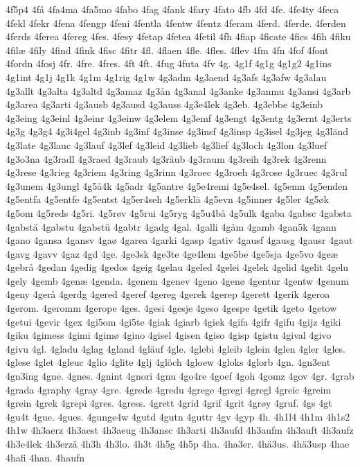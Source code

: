 4f5p4
4få
4fa4ma
4fa5mo
4fabo
4fag
4fank
4fary
4fato
4fb
4fd
4fe.
4fe4ty
4feca
4fekl
4fekr
4fena
4fengp
4feni
4fentla
4fentw
4fentz
4feram
4ferd.
4ferde.
4ferden
4ferds
4ferea
4fereg
4fes.
4fesy
4fetap
4fetea
4fetil
4fh
4fiap
4ficate
4fics
4fih
4fiku
4filæ
4fily
4find
4fink
4fisc
4fitr
4fl.
4flaen
4fle.
4fles.
4flev
4fm
4fn
4fof
4font
4fordn
4fosj
4fr.
4fre.
4fres.
4ft
4ft.
4fug
4futa
4fv
4g.
4g1f
4g1g
4g1g2
4g1ins
4g1int
4g1j
4g1k
4g1m
4g1rig
4g1w
4g3adm
4g3aend
4g3afs
4g3afw
4g3alau
4g3allt
4g3alta
4g3altd
4g3amaz
4g3ån
4g3anal
4g3anke
4g3anmu
4g3ansi
4g3arb
4g3area
4g3arti
4g3ausb
4g3ausd
4g3auss
4g3e4lek
4g3eb.
4g3ebbe
4g3einb
4g3eing
4g3einl
4g3einr
4g3einw
4g3elem
4g3emf
4g3engt
4g3entg
4g3ernt
4g3erts
4g3g
4g3g4
4g3i4gel
4g3inb
4g3inf
4g3inse
4g3insf
4g3insp
4g3isel
4g3jeg
4g3länd
4g3late
4g3lauc
4g3lauf
4g3lef
4g3leid
4g3lieb
4g3lief
4g3loch
4g3lon
4g3luef
4g3o3na
4g3radl
4g3raed
4g3raub
4g3räub
4g3raum
4g3reih
4g3rek
4g3renn
4g3rese
4g3rieg
4g3riem
4g3ring
4g3rinn
4g3roec
4g3roeh
4g3rose
4g3ruec
4g3rul
4g3unem
4g3ungl
4g5å4k
4g5adr
4g5antre
4g5e4remi
4g5e4sel.
4g5emn
4g5enden
4g5entfa
4g5entfe
4g5entst
4g5er4seh
4g5erklä
4g5evn
4g5inner
4g5ler
4g5øk
4g5om
4g5reds
4g5ri.
4g5røv
4g5rui
4g5ryg
4g5u4bå
4g5ulk
4gaba
4gabsc
4gabsta
4gabstä
4gabstu
4gabstü
4gabtr
4gadg
4gal.
4galli
4gåm
4gamb
4gan5k
4gann
4gano
4gansa
4gansv
4gaø
4garea
4garki
4gasp
4gativ
4gausf
4gausg
4gausr
4gaut
4gavg
4gavv
4gaz
4gd
4ge.
4ge3sk
4ge3te
4ge4lem
4ge5be
4ge5sja
4ge5vo
4geæ
4gebrå
4gedan
4gedig
4gedos
4geig
4gelau
4geled
4gelei
4gelek
4gelid
4gelit
4gelu
4gely
4gemb
4genæ
4genda.
4genem
4genev
4geno
4genø
4gentur
4gentw
4genum
4geny
4gerå
4gerdg
4gered
4geref
4gereg
4gerek
4gerep
4gerett
4gerik
4geroa
4gerom.
4geromm
4gerope
4ges.
4gesi
4gesje
4geso
4gespe
4getik
4geto
4getow
4getui
4gevir
4gex
4gi5om
4gi5te
4giak
4giarb
4giek
4gifa
4gifr
4gifu
4gijz
4giki
4giku
4gimess
4gimi
4gimø
4gino
4gisel
4gisen
4giso
4gisp
4gistu
4gival
4givo
4givu
4gl.
4gladu
4glag
4gland
4gläuf
4gle.
4glebi
4gleib
4glein
4glen
4gler
4gles.
4glese
4glet
4gleuc
4glio
4glite
4glj
4glöch
4gloew
4gloks
4glorb
4gn.
4gn3ent
4gn3ing
4gne.
4gnes.
4gnint
4gnori
4gnu
4go4re
4goef
4goh
4gomz
4gov
4gr.
4grab
4grada
4graphy
4gray
4gre.
4grede
4gredu
4grege
4gregi
4gregl
4greic
4greim
4grein
4grek
4grepi
4gres.
4gress.
4grett
4grid
4grif
4grit
4grøy
4gruf.
4gs
4gt
4gu4t
4gue.
4gues.
4gunge4w
4gutd
4gutn
4guttr
4gv
4gyp
4h.
4h1l4
4h1m
4h1s2
4h1w
4h3aerz
4h3aest
4h3aeug
4h3ansc
4h3arti
4h3aufd
4h3aufm
4h3auft
4h3aufz
4h3e4lek
4h3erzä
4h3h
4h3lo.
4h3t
4h5g
4h5p
4ha.
4ha3er.
4hä3us.
4hä3usp
4hae
4hafi
4han.
4haufn
